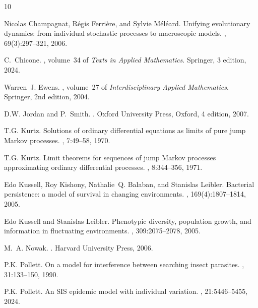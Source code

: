 \documentclass[12pt]{article}
\begin{document}
\def\cprime{$'$}
\begin{thebibliography}{10}

Nicolas Champagnat, R{\'e}gis Ferri{\`e}re, and Sylvie M{\'e}l{\'e}ard.
\newblock Unifying evolutionary dynamics: from individual stochastic processes
  to macroscopic models.
, 69(3):297--321, 2006.

C.~Chicone.
, volume~34 of
  {\em Texts in Applied Mathematics}.
\newblock Springer, 3 edition, 2024.

Warren~J. Ewens.
, volume~27 of {\em
  Interdisciplinary Applied Mathematics}.
\newblock Springer, 2nd edition, 2004.

D.W. Jordan and P.~Smith.
.
\newblock Oxford University Press, Oxford, 4 edition, 2007.

T.G. Kurtz.
\newblock Solutions of ordinary differential equations as limits of pure jump
  {M}arkov processes.
, 7:49--58, 1970.

T.G. Kurtz.
\newblock Limit theorems for sequences of jump {M}arkov processes approximating
  ordinary differential processes.
, 8:344--356, 1971.

Edo Kussell, Roy Kishony, Nathalie~Q. Balaban, and Stanislas Leibler.
\newblock Bacterial persistence: a model of survival in changing environments.
, 169(4):1807--1814, 2005.

Edo Kussell and Stanislas Leibler.
\newblock Phenotypic diversity, population growth, and information in
  fluctuating environments.
, 309:2075--2078, 2005.

M.~A. Nowak.
.
\newblock Harvard University Press, 2006.

P.K. Pollett.
\newblock On a model for interference between searching insect parasites.
, 31:133--150, 1990.

P.K. Pollett.
\newblock An {SIS} epidemic model with individual variation.
, 21:5446--5455, 2024.


\end{thebibliography}
\end{document}
